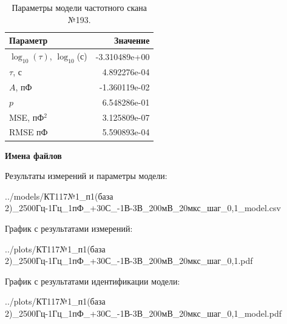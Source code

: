 \begin{table}[!ht]
    \centering
    \caption{Параметры модели частотного скана №193.}
    \begin{tabular}{|l|r|}
        \hline
        Параметр                                       & Значение                  \\ \hline
        $\log_{10}(\tau)$, $\log_{10}$(с)              & -3.310489e+00             \\ \hline
        $\tau$, с                                      & 4.892276e-04              \\ \hline
        $A$, пФ                                        & -1.360119e-02             \\ \hline
        $p$                                            & 6.548286e-01              \\ \hline
        MSE, пФ$^2$                                    & 3.125809e-07              \\ \hline
        RMSE пФ                                        & 5.590893e-04              \\ \hline
    \end{tabular}
    \label{table:frequency_scan_model_193}
\end{table}

\textbf{Имена файлов}

Результаты измерений и параметры модели:

\scriptsize../models/КТ117№1\_п1(база 2)\_2500Гц-1Гц\_1пФ\_+30С\_-1В-3В\_200мВ\_20мкс\_шаг\_0,1\_model.csv
\normalsize

График с результатами измерений:

\scriptsize../plots/КТ117№1\_п1(база 2)\_2500Гц-1Гц\_1пФ\_+30С\_-1В-3В\_200мВ\_20мкс\_шаг\_0,1.pdf
\normalsize

График с результатами идентификации модели:

\scriptsize../plots/КТ117№1\_п1(база 2)\_2500Гц-1Гц\_1пФ\_+30С\_-1В-3В\_200мВ\_20мкс\_шаг\_0,1\_model.pdf
\normalsize

